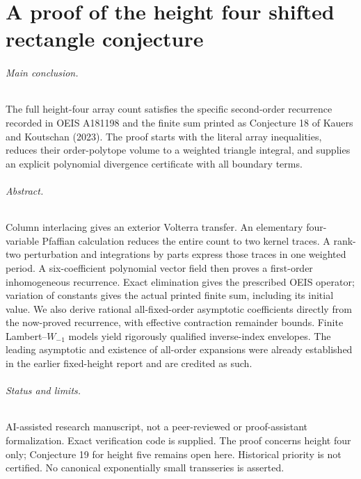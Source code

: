 \documentclass[11pt,letterpaper]{article}
\numberwithin{equation}{section}
\theoremstyle{definition}
\newcommand{\1}{\mathbf 1}
\begin{document}
\clearpage
\part{A proof of the height four shifted rectangle conjecture}
\label{shr:h4:part}

\smallskip
{}
\medskip

\paragraph{Main conclusion.}
The full height-four array count satisfies the specific second-order
recurrence recorded in OEIS A181198 and the finite sum printed as
Conjecture 18 of Kauers and Koutschan (2023). The proof starts with the
literal array inequalities, reduces their order-polytope volume to a
weighted triangle integral, and supplies an explicit polynomial divergence
certificate with all boundary terms.

\paragraph{Abstract.}
Column interlacing gives an exterior Volterra transfer. An elementary
four-variable Pfaffian calculation reduces the entire count to two kernel
traces. A rank-two perturbation and integrations by parts express those
traces in one weighted period. A six-coefficient polynomial vector field
then proves a first-order inhomogeneous recurrence. Exact elimination gives
the prescribed OEIS operator; variation of constants gives the actual
printed finite sum, including its initial value. We also derive rational
all-fixed-order asymptotic coefficients directly from the now-proved
recurrence, with effective contraction remainder bounds. Finite
Lambert--$W_{-1}$ models yield rigorously qualified inverse-index envelopes.
The leading asymptotic and existence of all-order expansions were already
established in the earlier fixed-height report and are credited as such.

\paragraph{Status and limits.}
AI-assisted research manuscript, not a peer-reviewed or proof-assistant
formalization. Exact verification code is supplied. The proof concerns
height four only; Conjecture 19 for height five remains open here.
Historical priority is not certified. No canonical exponentially small
transseries is asserted.
\end{document}
